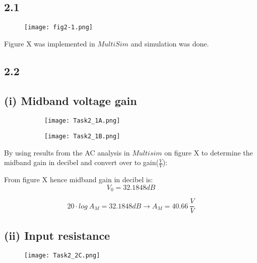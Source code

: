 \subsection*{2.1}
    \begin{figure}[h!]
        \centering
        \texttt{[image: fig2-1.png]}
    \end{figure}    

Figure X was implemented in $MultiSim$ and simulation was done.

\subsection*{2.2}
  \subsection*{(i) Midband voltage gain}

	\begin{figure}[h]
        \centering
        \begin{subfigure}[h]{0.7\textwidth}
                \texttt{[image: Task2\_1A.png]}
                \label{fig:HJÖRLEIFUR}
        \end{subfigure}
        \begin{subfigure}[h]{0.25\textwidth}
                \texttt{[image: Task2\_1B.png]}
                \label{fig:LÁRUS}
        \end{subfigure}
	\end{figure}

    By using results from the AC analysis in $Multisim$ on figure X to determine the midband gain in decibel and convert over to gain($\frac{V}{V}$):

   	From figure X hence midband gain in decibel is:
   	$$ V_{0} = 32.1848 dB $$ 

   	$$ 20 \cdot log{\ A_{M}} = 32.1848 dB \rightarrow A_{M} = 40.66\  \frac{V}{V} $$



	\subsection*{(ii) Input resistance}
    \begin{figure}[h!]
        \centering
        \texttt{[image: Task2\_2C.png]}
    \end{figure}  


